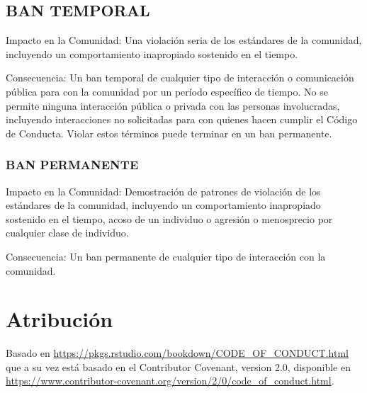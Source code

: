 \documentclass[
]{book}
\begin{document}
\hypertarget{ban-temporal}{%
\subsection{BAN TEMPORAL}\label{ban-temporal}}

Impacto en la Comunidad: Una violación seria de los estándares de la comunidad, incluyendo un comportamiento inapropiado sostenido en el tiempo.

Consecuencia: Un ban temporal de cualquier tipo de interacción o comunicación pública para con la comunidad por un período específico de tiempo. No se permite ninguna interacción pública o privada con las personas involucradas, incluyendo interacciones no solicitadas para con quienes hacen cumplir el Código de Conducta. Violar estos términos puede terminar en un ban permanente.

\hypertarget{ban-permanente}{%
\subsubsection{BAN PERMANENTE}\label{ban-permanente}}

Impacto en la Comunidad: Demostración de patrones de violación de los estándares de la comunidad, incluyendo un comportamiento inapropiado sostenido en el tiempo, acoso de un individuo o agresión o menosprecio por cualquier clase de individuo.

Consecuencia: Un ban permanente de cualquier tipo de interacción con la comunidad.

\hypertarget{atribuciuxf3n}{%
\section{Atribución}\label{atribuciuxf3n}}

Basado en \url{https://pkgs.rstudio.com/bookdown/CODE_OF_CONDUCT.html} que a su vez está basado en el Contributor Covenant, version 2.0, disponible en \url{https://www.contributor-covenant.org/version/2/0/code_of_conduct.html}.

  
\end{document}
